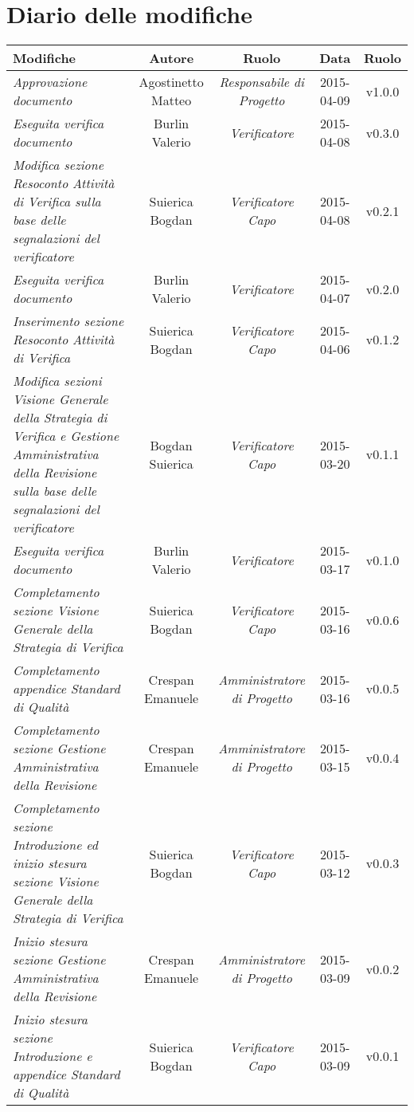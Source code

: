 \newpage
\section*{Diario delle modifiche}

\begin{table}[h]
\centering
\begin{tabular}{|p{}|c|c|c|c|}
	\toprule
		\textbf{Modifiche} & \textbf{Autore} & \textbf{Ruolo} & \textbf{Data} & \textbf{Ruolo} \\
	\midrule
	\midrule
		\textit{Approvazione documento} & Agostinetto Matteo & \textit{Responsabile di Progetto} & 2015-04-09 & v1.0.0 \\
	\midrule
		\textit{Eseguita verifica documento} & Burlin Valerio & \textit{Verificatore} & 2015-04-08 & v0.3.0 \\
	\midrule
		\textit{Modifica sezione Resoconto Attività di Verifica sulla base delle segnalazioni del verificatore} & Suierica Bogdan & \textit{Verificatore Capo} & 2015-04-08 & v0.2.1 \\
	\midrule
		\textit{Eseguita verifica documento} & Burlin Valerio & \textit{Verificatore} & 2015-04-07 & v0.2.0 \\
	\midrule
		\textit{Inserimento sezione Resoconto Attività di Verifica} & Suierica Bogdan & \textit{Verificatore Capo} & 2015-04-06 & v0.1.2 \\
	\midrule
		\textit{Modifica sezioni Visione Generale della Strategia di Verifica e Gestione Amministrativa della Revisione sulla base delle segnalazioni del verificatore} & Bogdan Suierica & \textit{Verificatore Capo} & 2015-03-20 & v0.1.1 \\
	\midrule
		\textit{Eseguita verifica documento} & Burlin Valerio & \textit{Verificatore} & 2015-03-17 & v0.1.0 \\
    \midrule
	    \textit{Completamento sezione Visione Generale della Strategia di Verifica} & Suierica Bogdan & \textit{Verificatore Capo} & 2015-03-16 & v0.0.6 \\
	\midrule
		\textit{Completamento appendice Standard di Qualità} & Crespan Emanuele & \textit{Amministratore di Progetto} & 2015-03-16 & v0.0.5 \\
	\midrule
		\textit{Completamento sezione Gestione Amministrativa della Revisione} & Crespan Emanuele & \textit{Amministratore di Progetto} & 2015-03-15 & v0.0.4 \\
	\midrule
		\textit{Completamento sezione Introduzione ed inizio stesura sezione Visione Generale della Strategia di Verifica} & Suierica Bogdan  & \textit{Verificatore Capo} & 2015-03-12 & v0.0.3 \\
	\midrule
		\textit{Inizio stesura sezione Gestione Amministrativa della Revisione} & Crespan Emanuele & \textit{Amministratore di Progetto} & 2015-03-09 & v0.0.2 \\	                         
	\midrule
		\textit{Inizio stesura sezione Introduzione e appendice Standard di Qualità} & Suierica Bogdan & \textit{Verificatore Capo} & 2015-03-09 & v0.0.1 \\
	\bottomrule
\end{tabular}	
\end{table}

\newpage